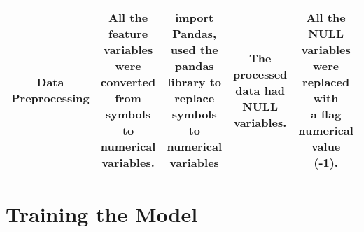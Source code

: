 \documentclass[10pt]{article}
\begin{document}
\begin{tabular}{| c | c | c | c | c |}
\rowcolor{green!5} \shortstack{Data \\ Preprocessing} & \shortstack{All the feature \\ variables were \\converted from \\ symbols to \\ numerical variables.} & \shortstack{import Pandas, \\ used the pandas \\ library to replace \\ symbols to \\numerical variables} & \shortstack{The processed \\ data had NULL \\ variables. } & \shortstack{All the NULL \\ variables were \\ replaced with \\ a flag numerical \\ value (-1). } \\\bottomrule
 \hline
\end{tabular}

\section{Training the Model}
\end{document}
